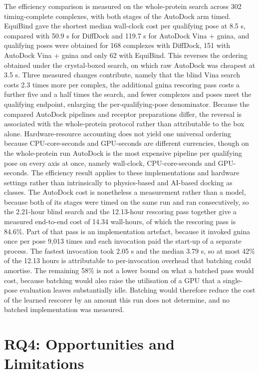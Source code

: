 The efficiency comparison is measured on the whole-protein search across 302 timing-complete complexes, with both stages of the AutoDock arm timed. EquiBind gave the shortest median wall-clock cost per qualifying pose at 8.5 s, compared with 50.9 s for DiffDock and 119.7 s for AutoDock Vina + gnina, and qualifying poses were obtained for 168 complexes with DiffDock, 151 with AutoDock Vina + gnina and only 62 with EquiBind. This reverses the ordering obtained under the crystal-boxed search, on which raw AutoDock was cheapest at 3.5 s. Three measured changes contribute, namely that the blind Vina search costs 2.3 times more per complex, the additional gnina rescoring pass costs a further five and a half times the search, and fewer complexes and poses meet the qualifying endpoint, enlarging the per-qualifying-pose denominator. Because the compared AutoDock pipelines and receptor preparations differ, the reversal is associated with the whole-protein protocol rather than attributable to the box alone. Hardware-resource accounting does not yield one universal ordering because CPU-core-seconds and GPU-seconds are different currencies, though on the whole-protein run AutoDock is the most expensive pipeline per qualifying pose on every axis at once, namely wall-clock, CPU-core-seconds and GPU-seconds. The efficiency result applies to these implementations and hardware settings rather than intrinsically to physics-based and AI-based docking as classes. The AutoDock cost is nonetheless a measurement rather than a model, because both of its stages were timed on the same run and ran consecutively, so the 2.21-hour blind search and the 12.13-hour rescoring pass together give a measured end-to-end cost of 14.34 wall-hours, of which the rescoring pass is 84.6\%. Part of that pass is an implementation artefact, because it invoked gnina once per pose 9,013 times and each invocation paid the start-up of a separate process. The fastest invocation took 2.05 s and the median 3.79 s, so at most 42\% of the 12.13 hours is attributable to per-invocation overhead that batching could amortise. The remaining 58\% is not a lower bound on what a batched pass would cost, because batching would also raise the utilisation of a GPU that a single-pose evaluation leaves substantially idle. Batching would therefore reduce the cost of the learned rescorer by an amount this run does not determine, and no batched implementation was measured.

\hypertarget{rq4-opportunities-and-limitations}{%
\section{RQ4: Opportunities and Limitations}\label{rq4-opportunities-and-limitations}}

